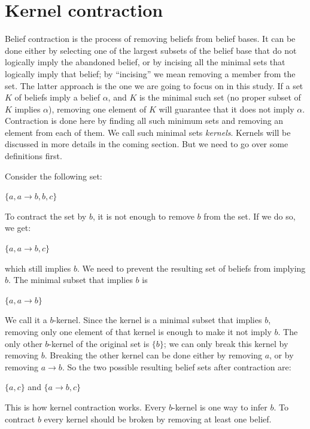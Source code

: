 \chapter{Kernel contraction}
Belief contraction is the process of removing beliefs from belief bases. It can be done either by selecting one  of the largest subsets of the belief base that do not logically imply the abandoned belief, or by incising all the minimal sets that logically imply that belief; by ``incising'' we mean removing a member from the set. The latter approach is the one we are going to focus on in this study. If a set $K$ of beliefs imply a belief $\alpha$, and $K$ is the minimal such set (no proper subset of $K$ implies $\alpha$), removing one element of $K$ will guarantee that it does not imply $\alpha$. Contraction is done here by finding all such minimum sets and removing an element from each of them. We call such minimal sets \textit{kernels}. Kernels will be discussed in more details in the coming section. But we need to go over some definitions first.

Consider the following set:
\begin{center}
$ \lbrace a, a \rightarrow b, b, c \rbrace $
\end{center}
To contract the set by $b$, it is not enough to remove $b$ from the set. If we do so, we get:
\begin{center}
$ \lbrace a, a \rightarrow b, c \rbrace $
\end{center}
which still implies $b$. We need to prevent the resulting set of beliefs from implying $b$. The minimal subset that implies $b$ is 
\begin{center}
$ \lbrace a, a \rightarrow b \rbrace $
\end{center}
We call it a $b$-kernel. Since the kernel is a minimal subset that implies $b$, removing only one element of that kernel is enough to make it not imply $b$. The only other $b$-kernel of the original set is $\lbrace b \rbrace$; we can only break this kernel by removing $b$. Breaking the other kernel can be done either by removing $a$, or by removing $a \rightarrow b$. So the two possible resulting belief sets after contraction are:
\begin{center}
$ \lbrace a, c \rbrace $ and $ \lbrace a \rightarrow b, c \rbrace $
\end{center}
This is how kernel contraction works. Every $b$-kernel is one way to infer $b$. To contract $b$ every kernel should be broken by removing at least one belief. 


